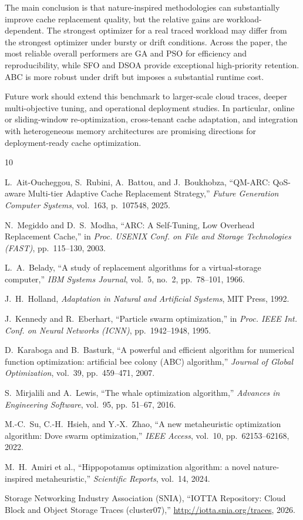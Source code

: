 \documentclass[10pt,journal,compsoc]{IEEEtran}
\begin{document}
The main conclusion is that nature-inspired methodologies can substantially improve cache replacement quality, but the relative gains are workload-dependent. The strongest optimizer for a real traced workload may differ from the strongest optimizer under bursty or drift conditions. Across the paper, the most reliable overall performers are GA and PSO for efficiency and reproducibility, while SFO and DSOA provide exceptional high-priority retention. ABC is more robust under drift but imposes a substantial runtime cost.

Future work should extend this benchmark to larger-scale cloud traces, deeper multi-objective tuning, and operational deployment studies. In particular, online or sliding-window re-optimization, cross-tenant cache adaptation, and integration with heterogeneous memory architectures are promising directions for deployment-ready cache optimization.

\begin{thebibliography}{10}

L.~Ait-Oucheggou, S.~Rubini, A.~Battou, and J.~Boukhobza,
``QM-ARC: QoS-aware Multi-tier Adaptive Cache Replacement Strategy,''
\emph{Future Generation Computer Systems}, vol.~163, p.~107548, 2025.

N.~Megiddo and D.~S.~Modha,
``ARC: A Self-Tuning, Low Overhead Replacement Cache,''
in \emph{Proc. USENIX Conf. on File and Storage Technologies (FAST)}, pp.~115--130, 2003.

L.~A.~Belady,
``A study of replacement algorithms for a virtual-storage computer,''
\emph{IBM Systems Journal}, vol.~5, no.~2, pp.~78--101, 1966.

J.~H.~Holland,
\emph{Adaptation in Natural and Artificial Systems},
MIT Press, 1992.

J.~Kennedy and R.~Eberhart,
``Particle swarm optimization,''
in \emph{Proc. IEEE Int. Conf. on Neural Networks (ICNN)}, pp.~1942--1948, 1995.

D.~Karaboga and B.~Basturk,
``A powerful and efficient algorithm for numerical function optimization: artificial bee colony (ABC) algorithm,''
\emph{Journal of Global Optimization}, vol.~39, pp.~459--471, 2007.

S.~Mirjalili and A.~Lewis,
``The whale optimization algorithm,''
\emph{Advances in Engineering Software}, vol.~95, pp.~51--67, 2016.

M.-C.~Su, C.-H.~Hsieh, and Y.-X.~Zhao,
``A new metaheuristic optimization algorithm: Dove swarm optimization,''
\emph{IEEE Access}, vol.~10, pp.~62153--62168, 2022.

M.~H.~Amiri et al.,
``Hippopotamus optimization algorithm: a novel nature-inspired metaheuristic,''
\emph{Scientific Reports}, vol.~14, 2024.

Storage Networking Industry Association (SNIA),
``IOTTA Repository: Cloud Block and Object Storage Traces (cluster07),''
\url{http://iotta.snia.org/traces}, 2026.

\end{thebibliography}
\end{document}

